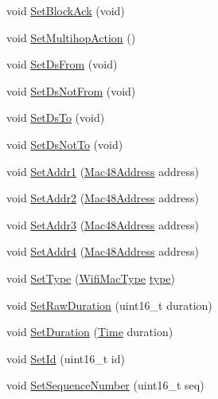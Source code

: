 \begin{DoxyCompactItemize}
\item 
void \hyperlink{classns3_1_1WifiMacHeader_a8556243ee1face543fd3c50368fac6a8}{Set\+Block\+Ack} (void)
\item 
void \hyperlink{classns3_1_1WifiMacHeader_a794eeda36945fc64412a016d2c6fa895}{Set\+Multihop\+Action} ()
\item 
void \hyperlink{classns3_1_1WifiMacHeader_ac4ec5b433a2701eae9cffb61b06ecec1}{Set\+Ds\+From} (void)
\item 
void \hyperlink{classns3_1_1WifiMacHeader_a02edeb349da4aacc6b376fcf76ff99cc}{Set\+Ds\+Not\+From} (void)
\item 
void \hyperlink{classns3_1_1WifiMacHeader_a577e95535beca95ba7f4a61a61e8b17d}{Set\+Ds\+To} (void)
\item 
void \hyperlink{classns3_1_1WifiMacHeader_a977cd5a09062bfc3660a23acdebd75ec}{Set\+Ds\+Not\+To} (void)
\item 
void \hyperlink{classns3_1_1WifiMacHeader_a6478a02b80d5c01657714c5c7a0ae1cb}{Set\+Addr1} (\hyperlink{classns3_1_1Mac48Address}{Mac48\+Address} address)
\item 
void \hyperlink{classns3_1_1WifiMacHeader_ab6a0efdc43d39b5da5d17eae9665271d}{Set\+Addr2} (\hyperlink{classns3_1_1Mac48Address}{Mac48\+Address} address)
\item 
void \hyperlink{classns3_1_1WifiMacHeader_ace2fd1624db247bd42cbe9182996bb0e}{Set\+Addr3} (\hyperlink{classns3_1_1Mac48Address}{Mac48\+Address} address)
\item 
void \hyperlink{classns3_1_1WifiMacHeader_a72c540fbe2cfeb64a00718756b8e0e0a}{Set\+Addr4} (\hyperlink{classns3_1_1Mac48Address}{Mac48\+Address} address)
\item 
void \hyperlink{classns3_1_1WifiMacHeader_a62110862831f8fe389b95f5ddbb54b3f}{Set\+Type} (\hyperlink{namespacens3_a9318472db39b35b2092de5c721e6ab0a}{Wifi\+Mac\+Type} \hyperlink{visualizer-ideas_8txt_add98db9e15e2a58cf2b57623e7aa893a}{type})
\item 
void \hyperlink{classns3_1_1WifiMacHeader_a1afdabe89c538d279cf8feb49df890d8}{Set\+Raw\+Duration} (uint16\+\_\+t duration)
\item 
void \hyperlink{classns3_1_1WifiMacHeader_a8c0936e7d1a0d1e43ccfcd21f43830fb}{Set\+Duration} (\hyperlink{classns3_1_1Time}{Time} duration)
\item 
void \hyperlink{classns3_1_1WifiMacHeader_abbff3a5249e8dc519e1ffa6980446b06}{Set\+Id} (uint16\+\_\+t id)
\item 
void \hyperlink{classns3_1_1WifiMacHeader_a51634924960a25606596916eabdcc12e}{Set\+Sequence\+Number} (uint16\+\_\+t seq)

\end{DoxyCompactItemize}
